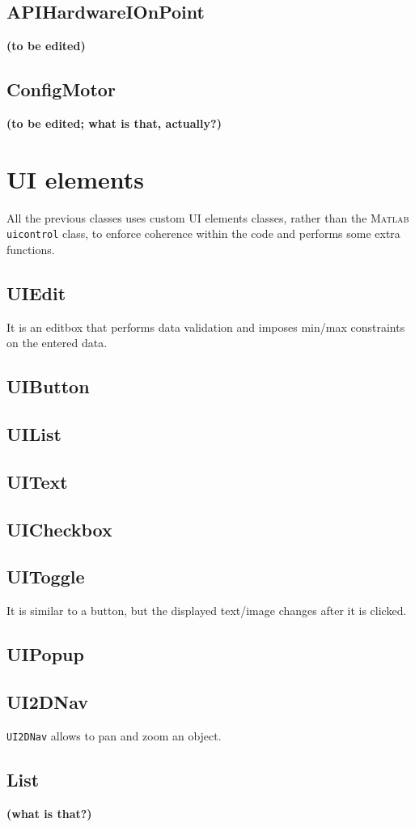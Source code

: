 \documentclass[10pt,letter,twoside]{report}
\newcommand{\temp}[1] {{\bf (#1)}}
\begin{document}
\subsection{APIHardwareIOnPoint}
\temp{to be edited}
\subsection{ConfigMotor}
\temp{to be edited; what is that, actually?}

\section{UI elements}
All the previous classes uses custom UI elements classes, rather than the \textsc{Matlab} \verb!uicontrol! class, to enforce coherence within the code and performs some extra functions.
\subsection{UIEdit}
It is an editbox that performs data validation and imposes min/max constraints on the entered data.
\subsection{UIButton}
\subsection{UIList}
\subsection{UIText}
\subsection{UICheckbox}
\subsection{UIToggle}
It is similar to a button, but the displayed text/image changes after it is clicked.
\subsection{UIPopup}
\subsection{UI2DNav}
\verb!UI2DNav! allows to pan and zoom an object.
\subsection{List}
\temp{what is that?}
\end{document}
